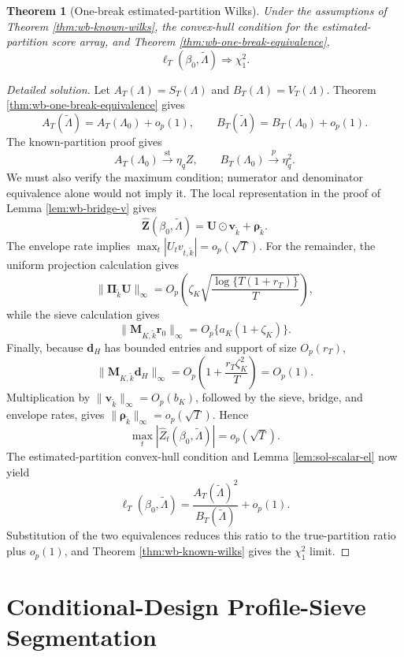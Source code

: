 \documentclass[12pt]{article}
\numberwithin{equation}{section}
\newtheorem{theorem}{Theorem}
\theoremstyle{definition}
\begin{document}
\begin{theorem}[One-break estimated-partition Wilks]
\label{thm:wb-one-break-wilks}
Under the assumptions of Theorem \ref{thm:wb-known-wilks}, the convex-hull condition for the estimated-partition score array, and Theorem \ref{thm:wb-one-break-equivalence},
\[
    \ell_T(\beta_0,\widetilde\Lambda)\Rightarrow\chi_1^2.
\]
\end{theorem}


\begin{proof}[Detailed solution]
Let \(A_T(\Lambda)=S_T(\Lambda)\) and \(B_T(\Lambda)=V_T(\Lambda)\).
Theorem \ref{thm:wb-one-break-equivalence} gives
\[
    A_T(\widetilde\Lambda)=A_T(\Lambda_0)+o_p(1),
    \qquad
    B_T(\widetilde\Lambda)=B_T(\Lambda_0)+o_p(1).
\]
The known-partition proof gives
\[
    A_T(\Lambda_0)\xrightarrow{\mathrm{st}}\eta_qZ,
    \qquad
    B_T(\Lambda_0)\xrightarrow{p}\eta_q^2.
\]
We must also verify the maximum condition; numerator and denominator
 equivalence alone would not imply it.  The local representation in the proof
of Lemma \ref{lem:wb-bridge-v} gives
\[
    \widehat{\bm Z}(\beta_0,\widetilde\Lambda)
    =\bm U\odot\bm v_{\widetilde k}+\bm\rho_{\widetilde k}.
\]
The envelope rate implies
\(\max_t|U_tv_{t,\widetilde k}|=o_p(\sqrt T)\).  For the remainder, the
uniform projection calculation gives
\[
    \|\bm\Pi_{\widetilde k}\bm U\|_\infty
    =O_p\left(
      \zeta_K\sqrt{\frac{\log\{T(1+r_T)\}}{T}}
    \right),
\]
while the sieve calculation gives
\[
    \|\bm M_{K,\widetilde k}\bm r_0\|_\infty
    =O_p\{a_K(1+\zeta_K)\}.
\]
Finally, because \(\bm d_H\) has bounded entries and support of size
\(O_p(r_T)\),
\[
    \|\bm M_{K,\widetilde k}\bm d_H\|_\infty
    =O_p\left(1+\frac{r_T\zeta_K^2}{T}\right)=O_p(1).
\]
Multiplication by \(\|\bm v_{\widetilde k}\|_\infty=O_p(b_K)\), followed by
the sieve, bridge, and envelope rates, gives
\(\|\bm\rho_{\widetilde k}\|_\infty=o_p(\sqrt T)\).  Hence
\[
    \max_t|\widehat Z_t(\beta_0,\widetilde\Lambda)|=o_p(\sqrt T).
\]
The estimated-partition convex-hull condition and Lemma
\ref{lem:sol-scalar-el} now yield
\[
    \ell_T(\beta_0,\widetilde\Lambda)
    =\frac{A_T(\widetilde\Lambda)^2}
           {B_T(\widetilde\Lambda)}+o_p(1).
\]
Substitution of the two equivalences reduces this ratio to the
true-partition ratio plus \(o_p(1)\), and Theorem
\ref{thm:wb-known-wilks} gives the \(\chi_1^2\) limit.
\end{proof}


\section{Conditional-Design Profile-Sieve Segmentation}
\label{sec:break-localization}
\end{document}
